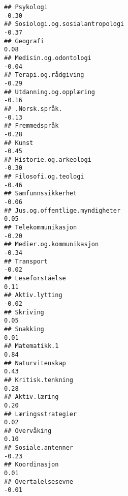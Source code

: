 \documentclass[
]{article}
\begin{document}
\begin{verbatim}
## Psykologi                                                                        -0.30
## Sosiologi.og.sosialantropologi                                                   -0.37
## Geografi                                                                          0.08
## Medisin.og.odontologi                                                            -0.04
## Terapi.og.rådgiving                                                              -0.29
## Utdanning.og.opplæring                                                           -0.16
## .Norsk.språk.                                                                    -0.13
## Fremmedspråk                                                                     -0.28
## Kunst                                                                            -0.45
## Historie.og.arkeologi                                                            -0.30
## Filosofi.og.teologi                                                              -0.46
## Samfunnssikkerhet                                                                -0.06
## Jus.og.offentlige.myndigheter                                                     0.05
## Telekommunikasjon                                                                -0.20
## Medier.og.kommunikasjon                                                          -0.34
## Transport                                                                        -0.02
## Leseforståelse                                                                    0.11
## Aktiv.lytting                                                                    -0.02
## Skriving                                                                          0.05
## Snakking                                                                          0.01
## Matematikk.1                                                                      0.84
## Naturvitenskap                                                                    0.43
## Kritisk.tenkning                                                                  0.28
## Aktiv.læring                                                                      0.20
## Læringsstrategier                                                                 0.02
## Overvåking                                                                        0.10
## Sosiale.antenner                                                                 -0.23
## Koordinasjon                                                                      0.01
## Overtalelsesevne                                                                 -0.01

\end{verbatim}
\end{document}
